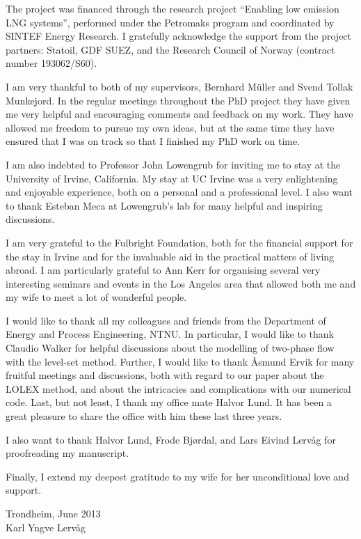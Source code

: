 \documentclass[11pt,b5paper,DIV=calc,BCOR1.3cm,headings=small,%
               footinclude=false,headsepline]{scrbook}
\begin{document}
The project was financed through the research project ``Enabling low emission
LNG systems'', performed under the Petromaks program and coordinated by SINTEF
Energy Research.  I gratefully acknowledge the support from the project
partners: Statoil, GDF SUEZ, and the Research Council of Norway (contract
number 193062/S60).

I am very thankful to both of my supervisors, Bernhard Müller and Svend Tollak
Munkejord.  In the regular meetings throughout the PhD project  they have given
me very helpful and encouraging comments and feedback on my work.  They have
allowed me freedom to pursue my own ideas, but at the same time they have
ensured that I was on track so that I finished my PhD work on time.

I am also indebted to Professor John Lowengrub for inviting me to stay at the
University of Irvine, California.  My stay at UC Irvine was a very enlightening
and enjoyable experience, both on a personal and a professional level.  I also
want to thank Esteban Meca at Lowengrub's lab for many helpful and inspiring
discussions.

I am very grateful to the Fulbright Foundation, both for the financial support
for the stay in Irvine and for the invaluable aid in the practical matters of
living abroad.  I am particularly grateful to Ann Kerr for organising several
very interesting seminars and events in the Los Angeles area that allowed both
me and my wife to meet a lot of wonderful people.

I would like to thank all my colleagues and friends from the Department of
Energy and Process Engineering, NTNU.  In particular, I would like to thank
Claudio Walker for helpful discussions about the modelling of two-phase flow
with the level-set method.  Further, I would like to thank Åsmund Ervik for
many fruitful meetings and discussions, both with regard to our paper about the
LOLEX method, and about the intricacies and complications with our numerical
code.  Last, but not least, I thank my office mate Halvor Lund.  It has been
a great pleasure to share the office with him these last three years.

I also want to thank Halvor Lund, Frode Bjørdal, and Lars Eivind Lervåg for
proofreading my manuscript.

Finally, I extend my deepest gratitude to my wife for her unconditional love
and support.

\vspace{2em}
\begin{flushright}
  Trondheim, June 2013 \\
  Karl Yngve Lervåg
\end{flushright}
\end{document}
